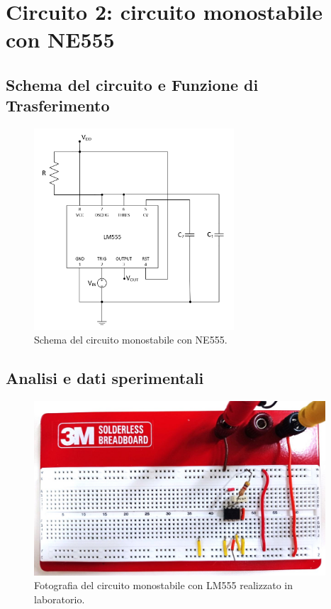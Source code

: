 \documentclass{report}
\begin{document}
\newpage
\section{Circuito 2: circuito monostabile con NE555}
\subsection{Schema del circuito e Funzione di Trasferimento}
\begin{figure}[h]
	\centering
	\includegraphics[height=7.5cm]{immagini/schema2}
	\caption{Schema del circuito monostabile con NE555.}
	\label{figura:schema2}
\end{figure}
\subsection{Analisi e dati sperimentali}
\begin{figure}[h]
	\centering
	\includegraphics[height=6.5cm]{immagini/circuito2}
	\caption{Fotografia del circuito monostabile con LM555 realizzato in laboratorio.}
	\label{figura:circuito2}
\end{figure}

\end{document}
